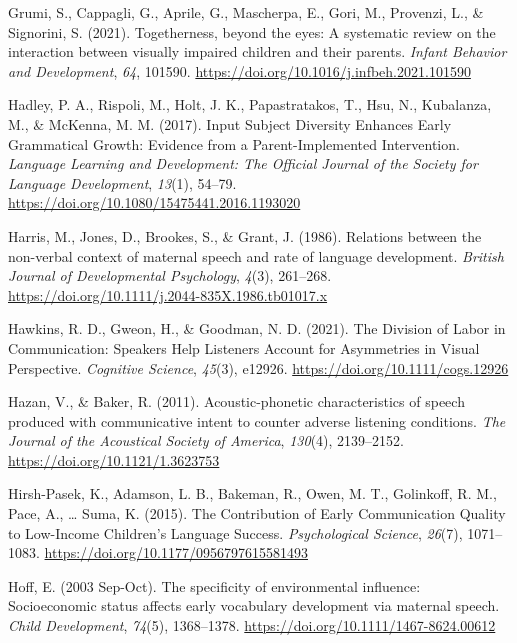 \documentclass[
  man,floatsintext]{apa6}
\newlength{\cslhangindent}
\newlength{\cslentryspacingunit} %
\newenvironment{CSLReferences}[2] %
 {%
  \setlength{\parindent}{0pt}
  \ifodd #1
  \let\oldpar\par
  \def\par{\hangindent=\cslhangindent\oldpar}
  \fi
  \setlength{\parskip}{#2\cslentryspacingunit}
 }%
 {}
\begin{document}
\begin{CSLReferences}{1}{0}
\leavevmode{}%
Grumi, S., Cappagli, G., Aprile, G., Mascherpa, E., Gori, M., Provenzi, L., \& Signorini, S. (2021). Togetherness, beyond the eyes: {A} systematic review on the interaction between visually impaired children and their parents. \emph{Infant Behavior and Development}, \emph{64}, 101590. \url{https://doi.org/10.1016/j.infbeh.2021.101590}

\leavevmode{}%
Hadley, P. A., Rispoli, M., Holt, J. K., Papastratakos, T., Hsu, N., Kubalanza, M., \& McKenna, M. M. (2017). Input {Subject Diversity Enhances Early Grammatical Growth}: {Evidence} from a {Parent-Implemented Intervention}. \emph{Language Learning and Development: The Official Journal of the Society for Language Development}, \emph{13}(1), 54--79. \url{https://doi.org/10.1080/15475441.2016.1193020}

\leavevmode{}%
Harris, M., Jones, D., Brookes, S., \& Grant, J. (1986). Relations between the non-verbal context of maternal speech and rate of language development. \emph{British Journal of Developmental Psychology}, \emph{4}(3), 261--268. \url{https://doi.org/10.1111/j.2044-835X.1986.tb01017.x}

\leavevmode{}%
Hawkins, R. D., Gweon, H., \& Goodman, N. D. (2021). The {Division} of {Labor} in {Communication}: {Speakers Help Listeners Account} for {Asymmetries} in {Visual Perspective}. \emph{Cognitive Science}, \emph{45}(3), e12926. \url{https://doi.org/10.1111/cogs.12926}

\leavevmode{}%
Hazan, V., \& Baker, R. (2011). Acoustic-phonetic characteristics of speech produced with communicative intent to counter adverse listening conditions. \emph{The Journal of the Acoustical Society of America}, \emph{130}(4), 2139--2152. \url{https://doi.org/10.1121/1.3623753}

\leavevmode{}%
Hirsh-Pasek, K., Adamson, L. B., Bakeman, R., Owen, M. T., Golinkoff, R. M., Pace, A., \ldots{} Suma, K. (2015). The {Contribution} of {Early Communication Quality} to {Low-Income Children}'s {Language Success}. \emph{Psychological Science}, \emph{26}(7), 1071--1083. \url{https://doi.org/10.1177/0956797615581493}

\leavevmode{}%
Hoff, E. (2003 Sep-Oct). The specificity of environmental influence: Socioeconomic status affects early vocabulary development via maternal speech. \emph{Child Development}, \emph{74}(5), 1368--1378. \url{https://doi.org/10.1111/1467-8624.00612}


\end{CSLReferences}
\end{document}
